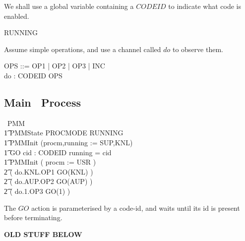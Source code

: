 We shall use a global variable containing a $CODEID$ to indicate
what code is enabled.
\begin{circus}
RUNNING 
\end{circus}

Assume simple operations,
and use a channel called $do$ to observe them.
\begin{circus}
   OPS ::= OP1 | OP2 | OP3 | INC
\\ \circchannel do : CODEID \cross OPS
\end{circus}



\newpage
\subsection{Main \Circus\ Process}

\begin{circus}
\circprocess\ PMM \circdef \circbegin \\
\t1 \circstate PMMState  PROCMODE \land RUNNING \\
\t1 PMMInit \circdef (procm,running := SUP,KNL) \\
\t1 GO \circdef
   \circval cid : CODEID \circspot
      \lcircguard running = cid \rcircguard \circguard \Skip \\
\t1 \circspot PMMInit \circseq
               ( procm := USR ) \\
\t2 \circseq ( do.KNL.OP1 \then GO(KNL) ) \\
\t2 \circseq ( do.AUP.OP2 \then GO(AUP) ) \\
\t2 \circseq ( do.1.OP3 \then GO(1) )\\
\circend
\end{circus}

The $GO$ action is parameterised by a code-id,
and waits until its id is present before terminating.


\newpage
\textbf{OLD STUFF BELOW}

